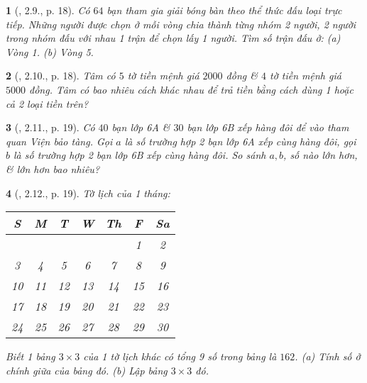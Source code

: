 \documentclass{article}
\newtheorem{baitoan}{}
\begin{document}
\begin{baitoan}[\cite{TLCT_THCS_Toan_6_so_hoc}, 2.9., p. 18]
	Có $64$ bạn tham gia giải bóng bàn theo thể thức đấu loại trực tiếp. Những người được chọn ở mỗi vòng chia thành từng nhóm 2 người, 2 người trong nhóm đấu với nhau 1 trận để chọn lấy 1 người. Tìm số trận đấu ở: (a) Vòng 1. (b) Vòng 5.
\end{baitoan}

\begin{baitoan}[\cite{TLCT_THCS_Toan_6_so_hoc}, 2.10., p. 18]
	Tâm có $5$ tờ tiền mệnh giá $2000$ đồng \& $4$ tờ tiền mệnh giá $5000$ đồng. Tâm có bao nhiêu cách khác nhau để trả tiền bằng cách dùng 1 hoặc cả 2 loại tiền trên?
\end{baitoan}

\begin{baitoan}[\cite{TLCT_THCS_Toan_6_so_hoc}, 2.11., p. 19]
	Có $40$ bạn lớp 6A \& $30$ bạn lớp 6B xếp hàng đôi để vào tham quan Viện bảo tàng. Gọi $a$ là số trường hợp 2 bạn lớp 6A xếp cùng hàng đôi, gọi $b$ là số trường hợp 2 bạn lớp 6B xếp cùng hàng đôi. So sánh $a,b$, số nào lớn hơn, \& lớn hơn bao nhiêu?
\end{baitoan}

\begin{baitoan}[\cite{TLCT_THCS_Toan_6_so_hoc}, 2.12., p. 19]
	Tờ lịch của 1 tháng:
	\begin{table}[H]
		\centering
		\begin{tabular}{|c|c|c|c|c|c|c|}
			\hline
			S & M & T & W & Th & F & Sa \\
			\hline
			&  &  &  &  & 1 & 2 \\
			3 & 4 & 5 & 6 & 7 & 8 & 9 \\
			10 & 11 & 12 & 13 & 14 & 15 & 16 \\
			17 & 18 & 19 & 20 & 21 & 22 & 23 \\
			24 & 25 & 26 & 27 & 28 & 29 & 30 \\
			\hline
		\end{tabular}
	\end{table}
	\noindent Biết 1 bảng $3\times3$ của 1 tờ lịch khác có tổng 9 số trong bảng là $162$. (a) Tính số ở chính giữa của bảng đó. (b) Lập bảng $3\times3$ đó.
\end{baitoan}


\printbibliography[heading=bibintoc]
	
\end{document}

